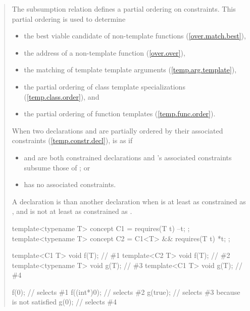 \begin{quote}
\begin{addedblock}
\pnum
The subsumption relation defines a partial ordering on constraints. 
This partial ordering is used to determine
% 
\begin{itemize}
\item the best viable candidate of non-template functions
     (\ref{over.match.best}), 
\item the address of a non-template function
     (\ref{over.over}), 
\item the matching of template template arguments
     (\ref{temp.arg.template}), 
\item the partial ordering of class template specializations
     (\ref{temp.class.order}), and
\item the partial ordering of function templates
     (\ref{temp.func.order}).
\end{itemize}

\pnum
When two declarations  and  are
partially ordered by their associated constraints (\ref{temp.constr.decl}), 
 is  as  if
% 
\begin{itemize}
\item {} and  are both constrained declarations and 
's associated constraints subsume those of ; or

\item {} has no associated constraints.
\end{itemize}

\pnum
A declaration  is 
than another declaration  when  is at least as
constrained as , and  is not at least as
constrained as .

\enterexample
\begin{codeblock}
template<typename T> concept C1 = requires(T t) { --t; };
template<typename T> concept C2 = C1<T> && requires(T t) { *t; };

template<C1 T> void f(T);       // \#1
template<C2 T> void f(T);       // \#2
template<typename T> void g(T); // \#3
template<C1 T> void g(T);       // \#4

f(0);       // selects \#1
f((int*)0); // selects \#2
g(true);    // selects \#3 because  is not satisfied
g(0);       // selects \#4
\end{codeblock}
\exitexample

\end{addedblock}
\end{quote}
